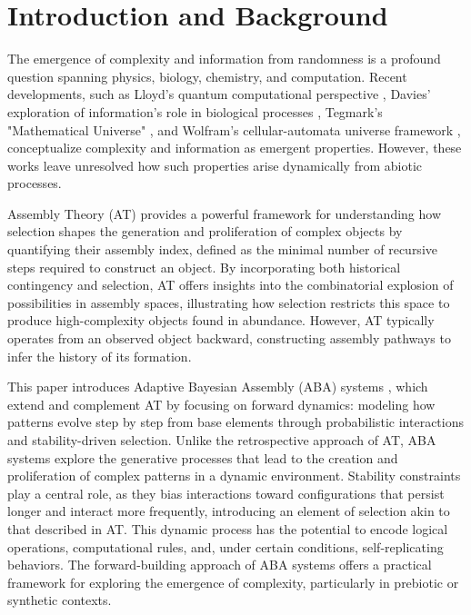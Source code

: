\documentclass[entropy,article,submit,pdftex,oneauthor]{Definitions/mdpi}
\begin{document}
\section{Introduction and Background}

The emergence of complexity and information from randomness is a profound question spanning physics, biology, chemistry, and computation. Recent developments, such as Lloyd's quantum computational perspective \cite{lloyd2006programming}, Davies' exploration of information's role in biological processes \cite{davies2019demon}, Tegmark's "Mathematical Universe" \cite{tegmark2008mathematical}, and Wolfram's cellular-automata universe framework \cite{wolfram2020fundamental}, conceptualize complexity and information as emergent properties. However, these works leave unresolved how such properties arise dynamically from abiotic processes.

Assembly Theory (AT) \cite{walker2023nature} provides a powerful framework for understanding how selection shapes the generation and proliferation of complex objects by quantifying their assembly index, defined as the minimal number of recursive steps required to construct an object. By incorporating both historical contingency and selection, AT offers insights into the combinatorial explosion of possibilities in assembly spaces, illustrating how selection restricts this space to produce high-complexity objects found in abundance. However, AT typically operates from an observed object backward, constructing assembly pathways to infer the history of its formation.

This paper introduces Adaptive Bayesian Assembly (ABA) systems \cite{adler2024howinfoevolves}, which extend and complement AT by focusing on forward dynamics: modeling how patterns evolve step by step from base elements through probabilistic interactions and stability-driven selection. Unlike the retrospective approach of AT, ABA systems explore the generative processes that lead to the creation and proliferation of complex patterns in a dynamic environment. Stability constraints play a central role, as they bias interactions toward configurations that persist longer and interact more frequently, introducing an element of selection akin to that described in AT. This dynamic process has the potential to encode logical operations, computational rules, and, under certain conditions, self-replicating behaviors. The forward-building approach of ABA systems offers a practical framework for exploring the emergence of complexity, particularly in prebiotic or synthetic contexts.
\end{document}
